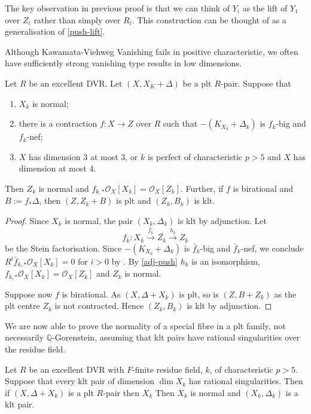\documentclass[a4paper,12pt]{book}
\newcommand{\ox}{\mathcal{O}_{X}}
\begin{document}
\begin{remark}
	The key observation in previous proof is that we can think of $Y_{i}$ as the lift of $Y_{1}$ over $Z_{i}$ rather than simply over $R_{i}$. This construction can be thought of as a generalisation of \autoref{push-lift}.
\end{remark}

Although Kawamata-Viehweg Vanishing fails in positive characteristic, we often have sufficiently strong vanishing type results in low dimensions.

\begin{lemma}\label{invAdj2}
	Let $R$ be an excellent DVR.
	Let $(X,X_{K}+\Delta)$ be a plt $R$-pair. Suppose that
	\begin{enumerate}
		\item $X_k$ is normal;
		\item there is a contraction $f \colon X \to Z$ over $R$ such that $-(K_{X_{k}}+\Delta_{k})$ is $f_{k}$-big and $f_k$-nef;
		\item $X$ has dimension $3$ at most 3, or $k$ is perfect of characteristic $p>5$ and $X$ has dimension at most 4.
	\end{enumerate}  
	Then $Z_{k}$ is normal and $f_{k,*}\ox[X_{k}]=\ox[Z_{k}]$. Further, if $f$ is birational and $B:=f_{*}\Delta$, then $(Z, Z_k+B)$ is plt and $(Z_{k},B_{k})$ is klt.
\end{lemma}

\begin{proof}
	Since $X_{k}$ is normal, the pair $(X_{k},\Delta_{k})$ is klt by adjunction. 
	Let $$f_{k}\colon X_{k} \xrightarrow{\bar{f}_{k}} \bar{Z_k} \xrightarrow{h_k} Z_{k}$$ be the Stein factorisation. 
	Since $-(K_{X_{k}}+\Delta_{k})$ is $\bar{f}_{k}$-big and $\bar{f}_{k}$-nef, we conclude $R^{i}\bar{f}_{k,*}\ox[X_{k}]=0$ for $i> 0$ by \cite[Proposition 3.2]{tanaka2018minimal}.
	By \autoref{adj-push} $h_k$ is an isomorphism, $f_{k,*}\ox[X_{k}]=\ox[Z_{k}]$ and $Z_{k}$ is normal.
	
	Suppose now $f$ is birational. As $(X,\Delta+X_k)$ is plt, so is $(Z,B+Z_k)$ as the plt centre $Z_k$ is not contracted. Hence $(Z_k,B_k)$ is klt by adjunction.			
\end{proof}

We are now able to prove the normality of a special fibre in a plt family, not necessarily $\mathbb{Q}$-Gorenstein, assuming that klt pairs have rational singularities over the residue field.

\begin{theorem}
	Let $R$ be an excellent DVR with $F$-finite residue field, $k$, of characteristic $p> 5$. Suppose that every klt pair of dimension $\dim X_{k}$ has rational singularities. Then if $(X,\Delta+X_{k})$ is a plt $R$-pair then $X_{k}$ Then $X_{k}$ is normal and $(X_{k}, \Delta_{k})$ is a klt pair.
\end{theorem}
\end{document}
